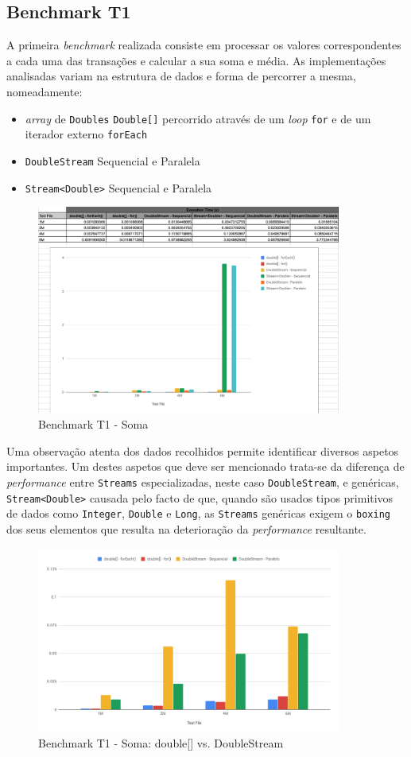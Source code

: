 \documentclass{article}
\begin{document}
\subsection{Benchmark T1}
A primeira \textit{benchmark} realizada consiste em processar os valores correspondentes a cada uma das transações e calcular a sua soma e média.
As implementações analisadas variam na estrutura de dados e forma de percorrer a mesma, nomeadamente: 
\begin{itemize}
    \item \textit{array} de \texttt{Doubles} \texttt{Double[]} percorrido através de um \textit{loop} \texttt{for} e de um iterador externo \texttt{forEach}
    \item \texttt{DoubleStream} Sequencial e Paralela
    \item \texttt{Stream<Double>} Sequencial e Paralela
\end{itemize}
\begin{figure}[H]
    \centering
    \includegraphics[width=10cm]{Pictures/T1.png}
    \caption{Benchmark T1 - Soma}
\end{figure}
Uma observação atenta dos dados recolhidos permite identificar diversos aspetos importantes. Um destes aspetos que deve ser mencionado trata-se da diferença de 
\textit{performance} entre \texttt{Streams} especializadas, neste caso \texttt{DoubleStream}, e genéricas, \texttt{Stream<Double>} causada pelo facto
de que, quando são usados tipos primitivos de dados como \texttt{Integer}, \texttt{Double} e \texttt{Long}, as \texttt{Streams} genéricas exigem o \texttt{boxing}
dos seus elementos que resulta na deterioração da \textit{performance} resultante.

\begin{figure}[H]
    \centering
    \includegraphics[width=10cm]{Pictures/T1_1.png}
    \caption{Benchmark T1 - Soma: double[] vs. DoubleStream}
\end{figure}
\end{document}
